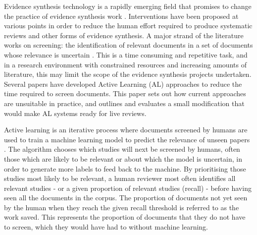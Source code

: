 \documentclass{bmcart}
\begin{document}
	Evidence synthesis technology is a rapidly emerging field that promises to change the practice of evidence synthesis work \cite{Westgate2018}.
	Interventions have been proposed at various points in order to reduce the human effort required to produce systematic reviews and other forms of evidence synthesis.
	A major strand of the literature works on screening: the identification of relevant documents in a set of documents whose relevance is uncertain \cite{OMara-Eves2015}. 
	This is a time consuming and repetitive task, and in a research environment with constrained resources and increasing amounts of literature, this may limit the scope of the evidence synthesis projects undertaken.
	Several papers have developed Active Learning (AL) approaches \cite{miwa2014, Wallace2010a, Wallace2010, Jonnalagadda2013, Przybya2018} to reduce the time required to screen documents. This paper sets out how current approaches are  unsuitable in practice, and outlines and evaluates a small modification that would make AL systems ready for live reviews.
	
	Active learning is an iterative process where documents screened by humans are used to train a machine learning model to predict the relevance of unseen papers \cite{Settles2009}.
	The algorithm chooses which studies will next be screened by humans, often those which are likely to be relevant or about which the model is uncertain, in order to generate more labels to feed back to the machine. 
	By prioritising those studies most likely to be relevant, a human reviewer most often identifies all relevant studies - or a given proportion of relevant studies (recall) - before having seen all the documents in the corpus. 
	The proportion of documents not yet seen by the human when they reach the given recall threshold is referred to as the work saved. This represents the proportion of documents that they do not have to screen, which they would have had to without machine learning.
	
\end{document}
